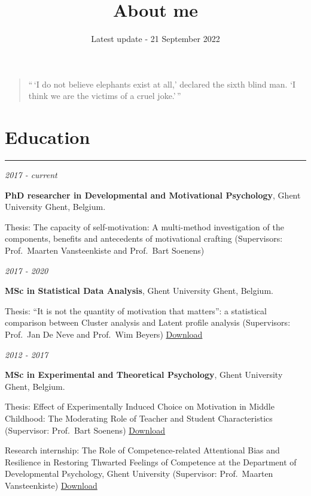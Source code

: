 \documentclass[
]{article}
\title{About me}
\author{Latest update - 21 September 2022}
\date{}
\begin{document}
\maketitle

{
\setcounter{tocdepth}{2}
\tableofcontents
}
\begin{quote}
``\,`I do not believe elephants exist at all,' declared the sixth blind
man. `I think we are the victims of a cruel joke.'\,''
\end{quote}

\hypertarget{education}{%
\section{\texorpdfstring{Education }{Education }}\label{education}}

\begin{center}\rule{0.5\linewidth}{0.5pt}\end{center}

\emph{2017 - current}

\textbf{PhD researcher in Developmental and Motivational Psychology},
Ghent University Ghent, Belgium.

Thesis: The capacity of self-motivation: A multi-method investigation of
the components, benefits and antecedents of motivational crafting
(Supervisors: Prof.~Maarten Vansteenkiste and Prof.~Bart Soenens)

\emph{2017 - 2020}

\textbf{MSc in Statistical Data Analysis}, Ghent University Ghent,
Belgium.

Thesis: ``It is not the quantity of motivation that matters'': a
statistical comparison between Cluster analysis and Latent profile
analysis (Supervisors: Prof.~Jan De Neve and Prof.~Wim Beyers)
\href{download/sciencs/masterproeven/Waterschoot_Joachim_MaStat.pdf}{Download
}

\emph{2012 - 2017}

\textbf{MSc in Experimental and Theoretical Psychology}, Ghent
University Ghent, Belgium.

Thesis: Effect of Experimentally Induced Choice on Motivation in Middle
Childhood: The Moderating Role of Teacher and Student Characteristics
(Supervisor: Prof.~Bart Soenens)
\href{download/sciencs/masterproeven/Thesis_JoachimWaterschoot.pdf}{Download
}

Research internship: The Role of Competence-related Attentional Bias and
Resilience in Restoring Thwarted Feelings of Competence at the
Department of Developmental Psychology, Ghent University (Supervisor:
Prof.~Maarten Vansteenkiste)
\href{download/sciencs/masterproeven/EPO_JoachimWaterschoot_01201353.pdf}{Download
}
\end{document}
